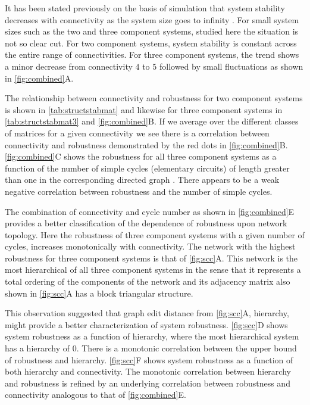 It has been stated previously on the basis of simulation that system stability decreases with connectivity as the system size goes to infinity \cite{May1972}. For small system sizes such as the two and three component systems, studied here the situation is not so clear cut. For two component systems, system stability is constant across the entire range of connectivities. For three component systems, the trend shows a minor decrease from connectivity $4$ to $5$ followed by small fluctuations as shown in \ref{fig:combined}A.

The relationship between connectivity and robustness for two component systems is shown in \ref{tab:structstabmat} and likewise for three component systems in \ref{tab:structstabmat3} and \ref{fig:combined}B. If we average over the different classes of matrices for a given connectivity we see there is a correlation between connectivity and robustness demonstrated by the red dots in \ref{fig:combined}B.
\ref{fig:combined}C shows the robustness for all three component systems as a function of the number of simple cycles (elementary circuits) of length greater than one in the corresponding directed graph \cite{Johnson1975}. There appears to be a weak negative correlation between robustness and the number of simple cycles.

The combination of connectivity and cycle number as shown in \ref{fig:combined}E provides a better classification of the dependence of robustness upon network topology. Here the robustness of three component systems with a given number of cycles, increases monotonically with connectivity. The network with the highest robustness for three component systems is that of \ref{fig:scc}A. This network is the most hierarchical of all three component systems in the sense that it represents a total ordering of the components of the network and its adjacency matrix also shown in \ref{fig:scc}A has a block triangular structure.

This observation suggested that graph edit distance from \ref{fig:scc}A, hierarchy, might provide a better characterization of system robustness. \ref{fig:scc}D shows system robustness as a function of hierarchy, where the most hierarchical system has a hierarchy of 0. There is a monotonic correlation between the upper bound of robustness and hierarchy. \ref{fig:scc}F shows system robustness as a function of both hierarchy and connectivity. The monotonic correlation between hierarchy and robustness is refined by an underlying correlation between robustness and connectivity analogous to that of \ref{fig:combined}E.

